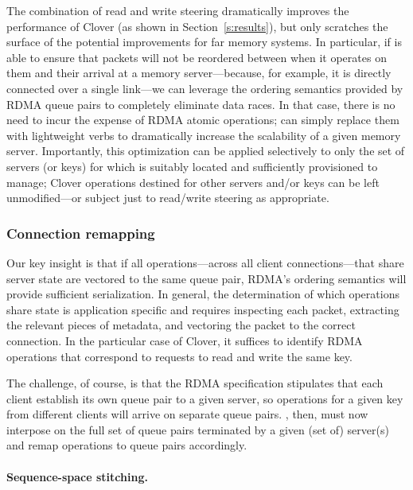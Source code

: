 The combination of read and write steering dramatically improves the
performance of Clover (as shown in Section~\ref{s:results}), but only
scratches the surface of the potential improvements for far memory
systems.  In particular, if {\sword} is able to ensure that
packets will not be reordered between when it operates on them and
their arrival at a memory server---because, for example, it is
directly connected over a single link---we can leverage the ordering
semantics provided by RDMA queue pairs to completely eliminate data
races.  In that case, there is no need to incur the expense of RDMA
atomic operations; {\sword} can simply replace them with lightweight verbs
to dramatically increase the scalability of a given memory server.
Importantly, this optimization can be applied selectively to only the
set of servers (or keys) for which {\sword} is suitably located
and sufficiently provisioned to manage; Clover operations destined
for other servers and/or keys can be left unmodified---or subject just
to read/write steering as appropriate.

\subsubsection{Connection remapping}

Our key insight is that if all operations---across all client
connections---that share server state are vectored to the same queue
pair, RDMA's ordering semantics will provide sufficient serialization.
In general, the determination of which operations share state is
application specific and requires inspecting each packet, extracting
the relevant pieces of metadata, and vectoring the packet to the
correct connection.  In the particular case of Clover, it suffices to
identify RDMA operations that correspond to requests to read and write
the same key.


The challenge, of course, is that the RDMA specification stipulates
that each client establish its own queue pair to a given server, so
operations for a given key from different clients will arrive on
separate queue pairs.  \sword, then, must now interpose on the
full set of queue pairs terminated by a given (set of) server(s) and
remap operations to queue pairs accordingly.

\paragraph{Sequence-space stitching.}

